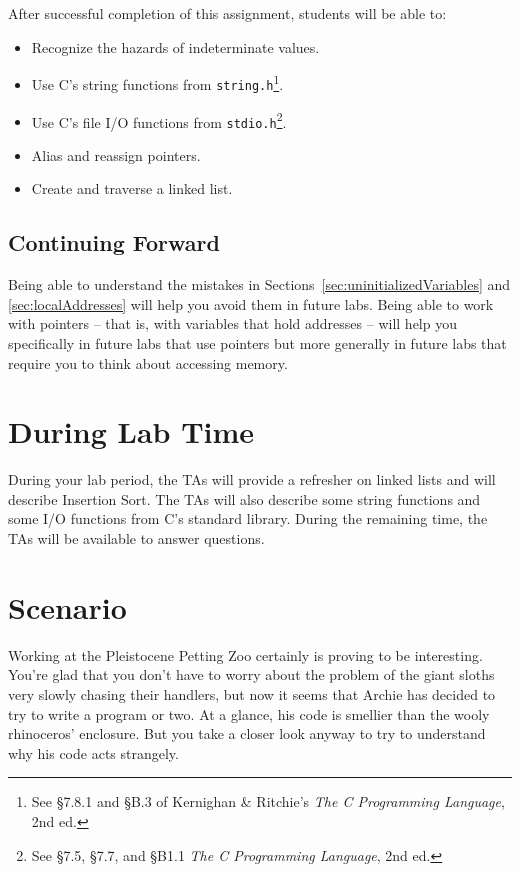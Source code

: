 After successful completion of this assignment, students will be able to:
\begin{itemize}
\item Recognize the hazards of indeterminate values.
\item Use C's string functions from \lstinline{string.h}\footnote{See \S7.8.1 and \S{}B.3 of Kernighan \& Ritchie's \textit{The C Programming Language}, 2nd ed.}.
\item Use C's file I/O functions from \lstinline{stdio.h}\footnote{See \S7.5, \S7.7, and \S{}B1.1 \textit{The C Programming Language}, 2nd ed.}.
\item Alias and reassign pointers.
\item Create and traverse a linked list.
\end{itemize}

\subsection*{Continuing Forward}

Being able to understand the mistakes in
Sections~\ref{sec:uninitializedVariables} and \ref{sec:localAddresses} will
help you avoid them in future labs. Being able to work with pointers -- that
is, with variables that hold addresses -- will help you specifically in future
labs that use pointers but more generally in future labs that require you to
think about accessing memory.

\section*{During Lab Time}

During your lab period, the TAs will provide a refresher on linked lists and
will describe Insertion Sort. The TAs will also describe some string functions
and some I/O functions from C's standard library. During the remaining time,
the TAs will be available to answer questions.

\softwareengineeringfrontmatter

\section*{Scenario}

Working at the Pleistocene Petting Zoo certainly is proving to be interesting.
You're glad that you don't have to worry about the problem of the giant sloths
very slowly chasing their handlers, but now it seems that Archie has decided to
try to write a program or two. At a glance, his code is smellier than the wooly
rhinoceros' enclosure. But you take a closer look anyway to try to understand
why his code acts strangely.

